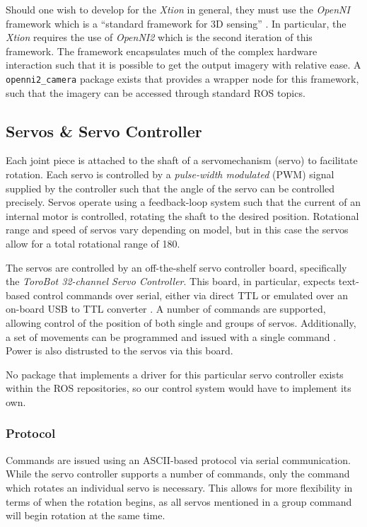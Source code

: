 Should one wish to develop for the \emph{Xtion} in general, they must use the \emph{OpenNI} framework which is a ``standard framework for 3D sensing'' \cite{openni_site}. In particular, the \emph{Xtion} requires the use of \emph{OpenNI2} which is the second iteration of this framework. The framework encapsulates much of the complex hardware interaction such that it is possible to get the output imagery with relative ease. A \texttt{openni2\_camera} package exists that provides a wrapper node for this framework, such that the imagery can be accessed through standard ROS topics.

\subsection{Servos \& Servo Controller}
Each joint piece is attached to the shaft of a servomechanism (servo) to facilitate rotation. Each servo is controlled by a \emph{pulse-width modulated} (PWM) signal supplied by the controller such that the angle of the servo can be controlled precisely. Servos operate using a feedback-loop system such that the current of an internal motor is controlled, rotating the shaft to the desired position. Rotational range and speed of servos vary depending on model, but in this case the servos allow for a total rotational range of 180\textdegree.

The servos are controlled by an off-the-shelf servo controller board, specifically the \emph{ToroBot 32-channel Servo Controller}. This board, in particular, expects text-based control commands over serial, either via direct TTL or emulated over an on-board USB to TTL converter \cite{torobot_manual}. A number of commands are supported, allowing control of the position of both single and groups of servos. Additionally, a set of movements can be programmed and issued with a single command \cite{torobot_manual}. Power is also distrusted to the servos via this board.

No package that implements a driver for this particular servo controller exists within the ROS repositories, so our control system would have to implement its own.

\subsubsection{Protocol}

Commands are issued using an ASCII-based protocol via serial communication. While the servo controller supports a number of commands, only the command which rotates an individual servo is necessary. This allows for more flexibility in terms of when the rotation begins, as all servos mentioned in a group command will begin rotation at the same time.

